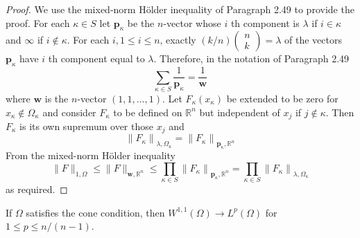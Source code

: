 \begin{proof}
  We use the mixed-norm Hölder inequality of Paragraph 2.49 to provide the proof. For each $\kappa \in S$ let $\mathbf{p}_\kappa$ be the $n$-vector whose $i$ th component is $\lambda$ if $i \in \kappa$ and $\infty$ if $i \notin \kappa$. For each $i, 1 \leq i \leq n$, exactly $(k / n)\left(\begin{array}{l}n \\ k\end{array}\right)=\lambda$ of the vectors $\mathbf{p}_\kappa$ have $i$ th component equal to $\lambda$. Therefore, in the notation of Paragraph 2.49
  \[
  \sum_{\kappa \in S} \frac{1}{\mathbf{p}_\kappa}=\frac{1}{\mathbf{w}}
  \]
  where $\mathbf{w}$ is the $n$-vector $(1,1, \ldots, 1)$.
  Let $F_\kappa\left(x_\kappa\right)$ be extended to be zero for $x_\kappa \notin \Omega_\kappa$ and consider $F_\kappa$ to be defined on $\mathbb{R}^n$ but independent of $x_j$ if $j \notin \kappa$. Then $F_\kappa$ is its own supremum over those $x_j$ and
  \[
  \left\|F_\kappa\right\|_{\lambda, \Omega_\kappa}=\left\|F_\kappa\right\|_{\mathbf{p}_\kappa, \mathbb{R}^n}
  \]
  From the mixed-norm Hölder inequality
  \[
  \|F\|_{1, \Omega} \leq\|F\|_{\mathbf{w}, \mathbb{R}^n} \leq \prod_{\kappa \in S}\left\|F_\kappa\right\|_{\mathbf{p}_\kappa, \mathbb{R}^n}=\prod_{\kappa \in S}\left\|F_\kappa\right\|_{\lambda, \Omega_\kappa}
  \]
  as required.
\end{proof}


\begin{lemma}
  If $\Omega$ satisfies the cone condition, then $W^{1,1}(\Omega) \rightarrow L^p(\Omega)$
  for $1 \leq p \leq n /(n-1)$.
\end{lemma}


